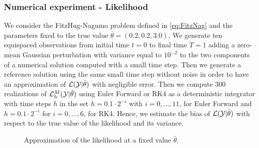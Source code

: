 \subsubsection{Numerical experiment - Likelihood}

We consider the FitzHug-Nagumo problem defined in \eqref{eq:FitzNag} and the parameters fixed to the true value $\bar\theta = (0.2, 0.2, 3.0)$. We generate ten equispaced observations from initial time $t = 0$ to final time $T = 1$ adding a zero-mean Gaussian perturbation with variance equal to $10^{-2}$ to the two components of a numerical solution computed with a small time step. Then we generate a reference solution using the same small time step without noise in order to have an approximation of $\mathcal{L}(\mathcal{Y}|\bar \theta)$ with negligible error. Then we compute 300 realizations of $\mathcal{L}_h^M(\mathcal{Y}|\bar \theta)$ using Euler Forward or RK4 as a deterministic integrator with time steps $h$ in the set $h = 0.1\cdot 2^{-i}$ with $i = 0, \ldots, 11$, for Euler Forward and $h = 0.1\cdot2^{-i}$ for $i = 0, \ldots, 6$, for RK4. Hence, we estimate the bias of $\mathcal{L}(\mathcal{Y}|\bar \theta)$ with respect to the true value of the likelihood and its variance.

\begin{figure}
	\centering
	\resizebox{0.6\linewidth}{!}{}
	\caption{Approximation of the likelihood at a fixed value $\bar \theta$.}
	\label{fig:MonteCarloVarianceH}
\end{figure}